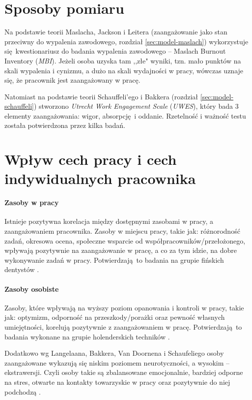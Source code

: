 \section{Sposoby pomiaru}
Na podstawie teorii Maslacha, Jackson i Leitera (zaangażowanie jako stan przeciwny do wypalenia zawodowego, rozdział \ref{sec:model-maslach}) wykorzystuje się kwestionariusz do badania wypalenia zawodowego -- Maslach Burnout Inventory (\emph{MBI}). Jeżeli osoba uzyska tam ,,złe" wyniki, tzn. mało punktów na skali wypalenia i cynizmu, a dużo na skali wydajności w pracy, wówczas uznaje się, że pracownik jest zaangażowany w pracę.

Natomiast na podstawie teorii Schauffeli'ego i Bakkera (rozdział \ref{sec:model-schauffeli}) stworzono \emph{Utrecht Work Engagement Scale} (\emph{UWES}), który bada 3 elementy zaangażowania: wigor, absorpcję i oddanie. Rzetelność i ważność testu została potwierdzona przez kilka badań.

\section{Wpływ cech pracy i cech indywidualnych pracownika}
\label{sec:theory-eng-infl}
\paragraph{Zasoby w pracy}
Istnieje pozytywna korelacja między dostępnymi zasobami w pracy, a zaangażowaniem pracownika. Zasoby w miejscu pracy, takie jak: różnorodność zadań, okresowa ocena, społeczne wsparcie od współpracowników/przełożonego, wpływają pozytywnie na zaangażowanie w pracę, a co za tym idzie, na dobre wykonywanie zadań w pracy. Potwierdzają to badania na grupie fińskich dentystów \cite{hakanen2008positive}.
\paragraph{Zasoby osobiste}
Zasoby, które wpływają na wyższy poziom opanowania i kontroli w pracy, takie jak: optymizm, odporność na przeszkody/porażki oraz pewność własnych umiejętności, korelują pozytywnie z zaangażowaniem w pracę. Potwierdzają to badania wykonane na grupie holenderskich techników \cite{xanthopoulou2007role}.

Dodatkowo wg Langelaana, Bakkera, Van Doornena i Schaufeliego osoby zaangażowane wykazują się niskim poziomem neurotyczności, a wysokim -- ekstrawersji. Czyli osoby takie są zbalansowane emocjonalnie, bardziej odporne na stres, otwarte na kontakty towarzyskie w pracy oraz pozytywnie do niej podchodzą \cite{langelaan2006burnout}. 

